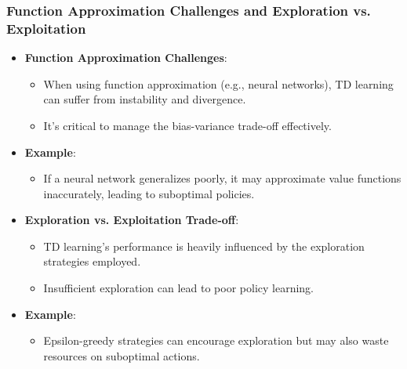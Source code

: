 \documentclass[aspectratio=169]{beamer}
\begin{document}
\begin{frame}[fragile]
    \frametitle{Function Approximation Challenges and Exploration vs. Exploitation}
    \begin{itemize}
        \item \textbf{Function Approximation Challenges}:
        \begin{itemize}
            \item When using function approximation (e.g., neural networks), TD learning can suffer from instability and divergence.
            \item It’s critical to manage the bias-variance trade-off effectively.
        \end{itemize}
        \item \textbf{Example}:
        \begin{itemize}
            \item If a neural network generalizes poorly, it may approximate value functions inaccurately, leading to suboptimal policies.
        \end{itemize}
    \end{itemize}

    \begin{itemize}
        \item \textbf{Exploration vs. Exploitation Trade-off}:
        \begin{itemize}
            \item TD learning's performance is heavily influenced by the exploration strategies employed.
            \item Insufficient exploration can lead to poor policy learning.
        \end{itemize}
        \item \textbf{Example}:
        \begin{itemize}
            \item Epsilon-greedy strategies can encourage exploration but may also waste resources on suboptimal actions.
        \end{itemize}
    \end{itemize}
\end{frame}
\end{document}
